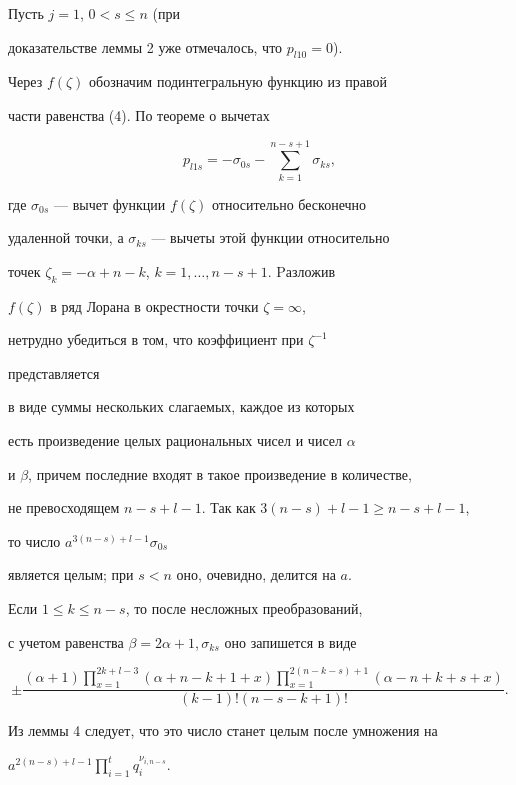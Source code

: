 \begin{pf} 


Пусть $j=1$, $0<s\le n$ (при 


доказательстве леммы 2 уже отмечалось, что $p_{l10}=0$). 


Через $f(\zeta)$ обозначим подинтегральную функцию из правой 


части равенства (4). По теореме о вычетах 


$$ 


p_{l1s}=-\sigma_{0s}-\sum^{n-s+1}_{k=1}\sigma_{ks}, 


$$ 


где $\sigma_{0s}$ --- вычет функции $f(\zeta)$ относительно бесконечно 


удаленной точки, а $\sigma_{ks}$ --- вычеты этой функции относительно 


точек $\zeta_k=-\alpha+n-k$, $k=1,\dotsc,n-s+1$. Pазложив 


$f(\zeta)$ в ряд Лорана в окрестности точки $\zeta=\infty$, 


нетрудно убедиться в том, что коэффициент при $\zeta^{-1}$ 


представляется 


в виде суммы нескольких слагаемых, каждое из которых 


есть произведение целых рациональных чисел и чисел $\alpha$ 


и $\beta$, причем последние входят в такое произведение в количестве, 


не превосходящем $n-s+l-1$. Так как $3(n-s)+l-1\ge n-s+l-1$, 


то число $a^{3(n-s)+l-1}\sigma_{0s}$ 


является целым; при $s<n$ оно, очевидно, делится на $a$. 


Если $1\le k\le n-s$, то после несложных преобразований,


с учетом равенства $\beta=2\alpha+1$,\,$\sigma_{ks}$ оно запишется в виде 


$$ 


\pm\frac{(\alpha+1)\prod\limits^{2k+l-3}_{x=1} 


(\alpha+n-k+1+x)\prod\limits^{2(n-k-s)+1}_{x=1} 


(\alpha-n+k+s+x)} 


{(k-1)!(n-s-k+1)!}. 


$$ 


Из леммы 4 следует, что это число станет целым после умножения на 


$a^{2(n-s)+l-1}\prod\limits^t_{i=1}q^{\nu_{i,n-s}}_i$. 



\end{pf}
